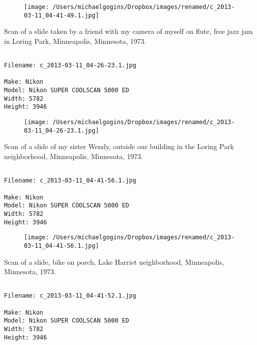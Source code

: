 \begin{figure}
\texttt{[image: /Users/michaelgogins/Dropbox/images/renamed/c\_2013-03-11\_04-41-49.1.jpg]}
\end{figure}
    
\clearpage
\onecolumn
\noindent Scan of a slide taken by a friend with my camera of myself on flute, free jazz jam in Loring Park, Minneapolis, Minnesota, 1973.
\noindent
\begin{lstlisting}

Filename: c_2013-03-11_04-26-23.1.jpg

Make: Nikon
Model: Nikon SUPER COOLSCAN 5000 ED
Width: 5782
Height: 3946
\end{lstlisting}
\clearpage

\begin{figure}
\texttt{[image: /Users/michaelgogins/Dropbox/images/renamed/c\_2013-03-11\_04-26-23.1.jpg]}
\end{figure}
    
\clearpage
\onecolumn
\noindent Scan of a slide of my sister Wendy, outside our building in the Loring Park neighborhood, Minneapolis, Minnesota, 1973.
\noindent
\begin{lstlisting}

Filename: c_2013-03-11_04-41-56.1.jpg

Make: Nikon
Model: Nikon SUPER COOLSCAN 5000 ED
Width: 5782
Height: 3946
\end{lstlisting}
\clearpage

\begin{figure}
\texttt{[image: /Users/michaelgogins/Dropbox/images/renamed/c\_2013-03-11\_04-41-56.1.jpg]}
\end{figure}
    
\clearpage
\onecolumn
\noindent Scan of a slide, bike on porch, Lake Harriet neighborhood, Minneapolis, Minnesota, 1973.
\noindent
\begin{lstlisting}

Filename: c_2013-03-11_04-41-52.1.jpg

Make: Nikon
Model: Nikon SUPER COOLSCAN 5000 ED
Width: 5782
Height: 3946
\end{lstlisting}
\clearpage

